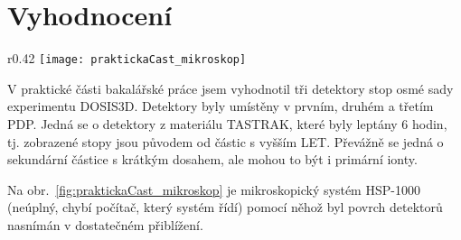 \section{Vyhodnocení}
\begin{wrapfigure}{r}{0.42\textwidth}
  \centering
  \texttt{[image: praktickaCast\_mikroskop]}
  \caption{Vysoko rychlostní optický mikroskop HSP-1000.~\cite{dosis_HSP1000}}
  \label{fig:praktickaCast_mikroskop}
  \vspace{-10pt}
\end{wrapfigure}
V praktické části bakalářské práce jsem vyhodnotil tři detektory stop osmé sady experimentu DOSIS3D. Detektory byly umístěny v prvním, druhém a třetím PDP. Jedná se o detektory z materiálu TASTRAK, které byly leptány 6 hodin, tj. zobrazené stopy jsou původem od částic s vyšším LET. Převážně se jedná o sekundární částice s krátkým dosahem, ale mohou to být i primární ionty.

Na obr.~\ref{fig:praktickaCast_mikroskop} je mikroskopický systém HSP-1000 (neúplný, chybí počítač, který systém řídí) pomocí něhož byl povrch detektorů nasnímán v dostatečném přiblížení.


